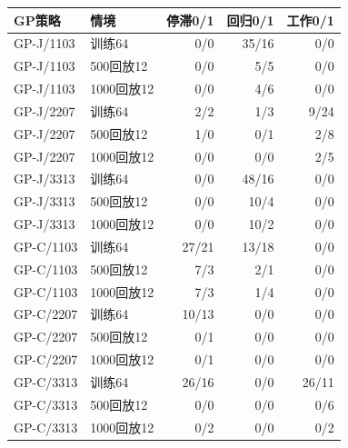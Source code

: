\begin{tabular}{@{}llrrr@{}}
\toprule
GP策略 & 情境 & 停滞0/1 & 回归0/1 & 工作0/1 \\ \midrule
GP-J/1103 & 训练64 & 0/0 & 35/16 & 0/0 \\
GP-J/1103 & 500回放12 & 0/0 & 5/5 & 0/0 \\
GP-J/1103 & 1000回放12 & 0/0 & 4/6 & 0/0 \\
GP-J/2207 & 训练64 & 2/2 & 1/3 & 9/24 \\
GP-J/2207 & 500回放12 & 1/0 & 0/1 & 2/8 \\
GP-J/2207 & 1000回放12 & 0/0 & 0/0 & 2/5 \\
GP-J/3313 & 训练64 & 0/0 & 48/16 & 0/0 \\
GP-J/3313 & 500回放12 & 0/0 & 10/4 & 0/0 \\
GP-J/3313 & 1000回放12 & 0/0 & 10/2 & 0/0 \\
GP-C/1103 & 训练64 & 27/21 & 13/18 & 0/0 \\
GP-C/1103 & 500回放12 & 7/3 & 2/1 & 0/0 \\
GP-C/1103 & 1000回放12 & 7/3 & 1/4 & 0/0 \\
GP-C/2207 & 训练64 & 10/13 & 0/0 & 0/0 \\
GP-C/2207 & 500回放12 & 0/1 & 0/0 & 0/0 \\
GP-C/2207 & 1000回放12 & 0/1 & 0/0 & 0/0 \\
GP-C/3313 & 训练64 & 26/16 & 0/0 & 26/11 \\
GP-C/3313 & 500回放12 & 0/0 & 0/0 & 0/6 \\
GP-C/3313 & 1000回放12 & 0/2 & 0/0 & 0/2 \\
\bottomrule
\end{tabular}
